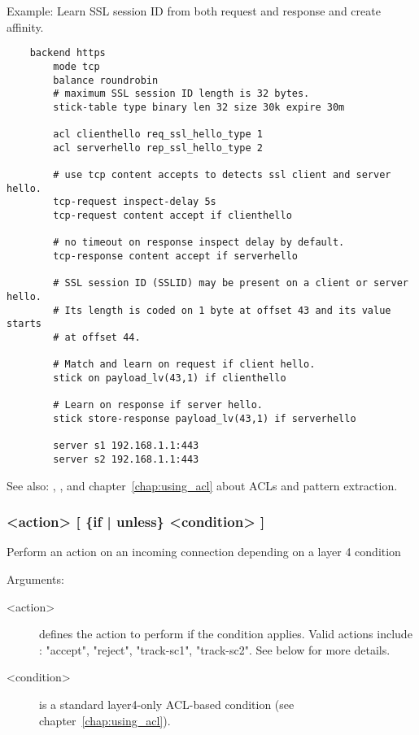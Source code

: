 {  Example: Learn SSL session ID from both request and response and create affinity.
  \begin{verbatim}
    backend https
        mode tcp
        balance roundrobin
        # maximum SSL session ID length is 32 bytes.
        stick-table type binary len 32 size 30k expire 30m

        acl clienthello req_ssl_hello_type 1
        acl serverhello rep_ssl_hello_type 2

        # use tcp content accepts to detects ssl client and server hello.
        tcp-request inspect-delay 5s
        tcp-request content accept if clienthello

        # no timeout on response inspect delay by default.
        tcp-response content accept if serverhello

        # SSL session ID (SSLID) may be present on a client or server hello.
        # Its length is coded on 1 byte at offset 43 and its value starts
        # at offset 44.

        # Match and learn on request if client hello.
        stick on payload_lv(43,1) if clienthello

        # Learn on response if server hello.
        stick store-response payload_lv(43,1) if serverhello

        server s1 192.168.1.1:443
        server s2 192.168.1.1:443
  \end{verbatim}

  See also: , , and chapter~\ref{chap:using_acl} about ACLs and pattern
             extraction.

\subsubsection[tcp-request connection]{ <action> [ \{if | unless\} <condition> ]}

  Perform an action on an incoming connection depending on a layer 4 condition


  Arguments:
  \begin{description}
  \item[<action>] defines the action to perform if the condition applies. Valid
                actions include : "accept", "reject", "track-sc1", "track-sc2".
                See below for more details.

  \item[<condition>] is a standard layer4-only ACL-based condition (see chapter~\ref{chap:using_acl}).
  \end{description}

}
